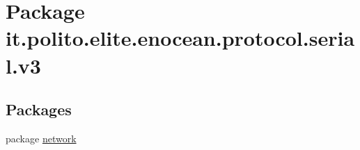 \hypertarget{namespaceit_1_1polito_1_1elite_1_1enocean_1_1protocol_1_1serial_1_1v3}{}\section{Package it.\+polito.\+elite.\+enocean.\+protocol.\+serial.\+v3}
\label{namespaceit_1_1polito_1_1elite_1_1enocean_1_1protocol_1_1serial_1_1v3}
\subsection*{Packages}
\begin{DoxyCompactItemize}
\item 
package \hyperlink{namespaceit_1_1polito_1_1elite_1_1enocean_1_1protocol_1_1serial_1_1v3_1_1network}{network}
\end{DoxyCompactItemize}

